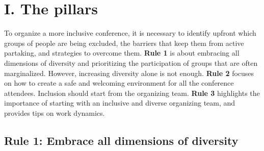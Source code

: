 \documentclass[10pt,letterpaper]{article}
\begin{document}
\section*{I. The pillars}

To organize a more inclusive conference, it is necessary to identify upfront which groups of people are being excluded, the barriers that keep them from active partaking, and strategies to overcome them. 
\textbf{Rule 1} is about embracing all dimensions of diversity and prioritizing the participation of groups that are often marginalized.
However, increasing diversity alone is not enough. \textbf{Rule 2} focuses on how to create a safe and welcoming environment for all the conference attendees. 
Inclusion should start from the organizing team. \textbf{Rule 3} highlights the importance of starting with an inclusive and diverse organizing team, and provides tips on work dynamics.


\subsection*{Rule 1: Embrace all dimensions of diversity}
\label{rule_diversity}
\end{document}
